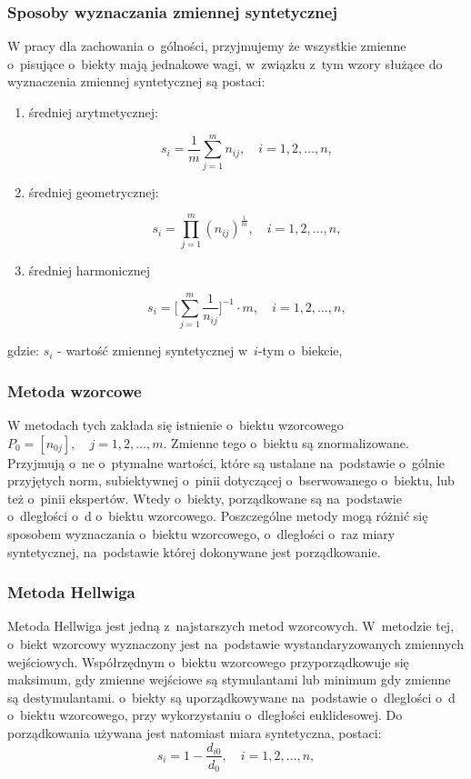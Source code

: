 \documentclass[12pt,a4paper]{report}
\begin{document}
\subsubsection{Sposoby wyznaczania zmiennej syntetycznej}
W pracy dla zachowania o~gólności, przyjmujemy że wszystkie zmienne o~pisujące o~biekty mają jednakowe wagi, w~związku z~tym wzory służące do wyznaczenia zmiennej syntetycznej są postaci:
\begin{enumerate}
\item średniej arytmetycznej:

$$
s_{i}=\frac{1}{m} \sum_{j=1}^{m} n_{ij},  \quad i=1, 2, \ldots, n,
$$

\item średniej geometrycznej:

$$
s_{i}=\prod_{j=1}^{m} (n_{ij})^{\frac{1}{m}}, \quad i=1, 2, \ldots, n,
$$

\item średniej harmonicznej

$$
s_{i}=\big[\sum_{j=1}^{m} \frac{1}{n_{ij}}\big]^{-1} \cdot m, \quad i=1, 2, \ldots, n,
$$

\end{enumerate}
gdzie:
$s_{i}$ - wartość zmiennej syntetycznej w~$i$-tym o~biekcie,

\subsubsection{Metoda wzorcowe}


W metodach tych zakłada się istnienie o~biektu wzorcowego $P_{0}=[n_{0j}], \quad  j= 1,2,\ldots,m$. Zmienne tego o~biektu są znormalizowane. Przyjmują o~ne o~ptymalne wartości, które są ustalane na~podstawie o~gólnie przyjętych norm, subiektywnej o~pinii dotyczącej o~bserwowanego o~biektu, lub też o~pinii ekspertów. Wtedy o~biekty, porządkowane są na~podstawie o~dległości o~d o~biektu wzorcowego. 
Poszczególne metody mogą różnić się sposobem wyznaczania o~biektu wzorcowego, o~dległości o~raz miary syntetycznej, na~podstawie której dokonywane jest porządkowanie.

\subsubsection{Metoda Hellwiga}


Metoda Hellwiga jest jedną z~najstarszych metod wzorcowych. W~metodzie tej, o~biekt wzorcowy wyznaczony jest na~podstawie wystandaryzowanych zmiennych wejściowych. Współrzędnym o~biektu wzorcowego przyporządkowuje się maksimum, gdy zmienne wejściowe są stymulantami lub minimum gdy zmienne są destymulantami. o~biekty są uporządkowywane na~podstawie o~dległości o~d o~biektu wzorcowego, przy wykorzystaniu o~dległości euklidesowej.
Do porządkowania używana jest natomiast miara syntetyczna, postaci: 
$$
s_i=1-\frac{d_{i0}}{d_{0}},\quad i=1, 2, \ldots, n ,
$$
\end{document}
